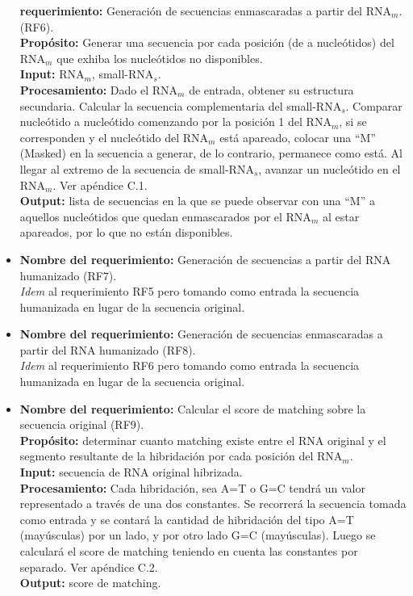 \documentclass[12pt,a4paper,spanish]{article}
\begin{document}
\begin{itemize}
 		\textbf{requerimiento:} Generación de secuencias enmascaradas a partir del RNA$_m$. (RF6).\\
 	    \textbf{Propósito:} Generar una secuencia por cada posición (de a nucleótidos) del RNA$_m$ que exhiba los 								nucleótidos no disponibles. \\
		\textbf{Input:} RNA$_m$, small-RNA$_s$. \\
		\textbf{Procesamiento:} Dado el RNA$_m$ de entrada, obtener su estructura secundaria. Calcular la 									secuencia complementaria del small-RNA$_s$. Comparar nucleótido a nucleótido 									comenzando por la posición 1 del RNA$_m$, si se corresponden y el nucleótido 									del RNA$_m$ está apareado, colocar una ``M'' (Masked) en la secuencia a generar, de lo 									contrario, permanece como está. Al llegar al extremo de la secuencia de small-RNA$_s$, 									avanzar un nucleótido en el RNA$_m$. Ver apéndice C.1. \\
		\textbf{Output:} lista de secuencias en la que se puede observar con una ``M'' a aquellos nucleótidos que quedan 							 enmascarados por el RNA$_m$ al estar apareados, por lo que no están disponibles.

		\item \textbf{Nombre del requerimiento:} Generación de secuencias a partir del RNA humanizado (RF7).\\
		\textit{Idem} al requerimiento RF5 pero tomando como entrada la secuencia humanizada en lugar de la secuencia 						original. \\

		\item \textbf{Nombre del requerimiento:} Generación de secuencias enmascaradas a partir del RNA humanizado (RF8).\\
		\textit{Idem} al requerimiento RF6 pero tomando como entrada la secuencia humanizada en lugar de la secuencia 						original. \\
		
		\item \textbf{Nombre del requerimiento:} Calcular el score de matching sobre la secuencia original (RF9).\\
 	    \textbf{Propósito:} determinar cuanto matching existe entre el RNA original y el segmento resultante 
							de la hibridación por cada posición del RNA$_m$.\\
		\textbf{Input:} secuencia de RNA original hibrizada. \\
		\textbf{Procesamiento:} Cada hibridación, sea A=T o G=C tendrá un valor representado a través de una dos 									constantes. Se recorrerá la secuencia tomada como entrada y se contará la cantidad de 									hibridación del tipo A=T (mayúsculas) por un lado, y por otro lado G=C (mayúsculas). Luego 									se calculará el score de matching teniendo en cuenta las constantes por separado. Ver 									apéndice C.2. \\								
		\textbf{Output:} score de matching.\\


\end{itemize}
\end{document}
